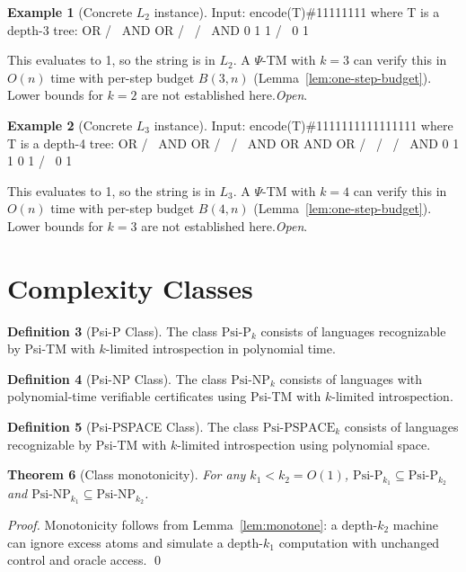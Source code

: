 \documentclass[11pt]{article}
\newtheorem{theorem}{Theorem}[section]
\theoremstyle{plain}
\theoremstyle{definition}
\newtheorem{definition}[theorem]{Definition}
\newtheorem{example}[theorem]{Example}
\newcommand{\PSi}{\Psi}
\begin{document}
\begin{example}[Concrete $L_2$ instance]
Input: encode(T)\#11111111 where T is a depth-3 tree:
        OR
       /  \
      AND  OR
     /  \  / \
    AND  0 1  1
   /  \
  0    1

This evaluates to 1, so the string is in $L_2$.
A $\PSi$-TM with $k=3$ can verify this in $O(n)$ time with per-step budget $B(3,n)$ (Lemma~\ref{lem:one-step-budget}). Lower bounds for $k=2$ are not established here.\;\emph{Open}.
\end{example}

\begin{example}[Concrete $L_3$ instance]
Input: encode(T)\#1111111111111111 where T is a depth-4 tree:
         OR
        /  \
       AND  OR
      /  \  / \
     AND  OR AND OR
    /  \  / \  / \
   AND  0 1  1 0  1
  /  \
 0    1

This evaluates to 1, so the string is in $L_3$.
A $\PSi$-TM with $k=4$ can verify this in $O(n)$ time with per-step budget $B(4,n)$ (Lemma~\ref{lem:one-step-budget}). Lower bounds for $k=3$ are not established here.\;\emph{Open}.
\end{example}

\section{Complexity Classes}

\begin{definition}[Psi-P Class]
The class $\text{Psi-P}_k$ consists of languages recognizable by Psi-TM with $k$-limited introspection in polynomial time.
\end{definition}

\begin{definition}[Psi-NP Class]
The class $\text{Psi-NP}_k$ consists of languages with polynomial-time verifiable certificates using Psi-TM with $k$-limited introspection.
\end{definition}

\begin{definition}[Psi-PSPACE Class]
The class $\text{Psi-PSPACE}_k$ consists of languages recognizable by Psi-TM with $k$-limited introspection using polynomial space.
\end{definition}

\begin{theorem}[Class monotonicity]
For any $k_1 < k_2 = O(1)$, $\text{Psi-P}_{k_1} \subseteq \text{Psi-P}_{k_2}$ and $\text{Psi-NP}_{k_1} \subseteq \text{Psi-NP}_{k_2}$.
\end{theorem}
\begin{proof}
Monotonicity follows from Lemma~\ref{lem:monotone}: a depth-$k_2$ machine can ignore excess atoms and simulate a depth-$k_1$ computation with unchanged control and oracle access. \qed
\end{proof}
\end{document}
